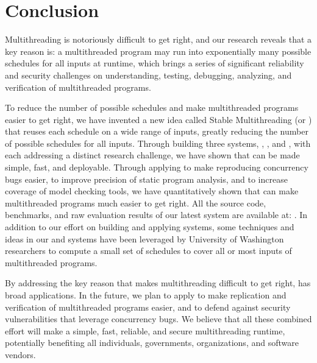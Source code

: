\chapter{Conclusion} \label{sec:conclusion}

Multithreading is notoriously difficult to get right, and our research reveals
that a key reason is: a multithreaded program may run into exponentially many
possible schedules for all inputs at runtime, which brings a series of
significant reliability and security challenges on understanding,
testing, debugging, analyzing, and verification of multithreaded
programs.

To reduce the number of possible schedules and make multithreaded
programs easier to get right, we have invented a new idea called Stable
Multithreading (or \smt) that reuses each schedule on a wide range of inputs,
greatly reducing the number of possible schedules for all inputs. Through
building three \smt systems, \tern, \peregrine, and \parrot, with each addressing
a distinct research challenge, we have shown that \smt can be made simple, fast,
and deployable. Through applying \smt to make reproducing concurrency bugs
easier, to improve precision of static program analysis, and to increase
coverage of model checking tools, we have quantitatively shown that \smt can
make multithreaded programs much easier to get right. All the source code,
benchmarks, and raw evaluation results of our latest \smt system \parrot are
available at: \github. In addition to our effort on building and applying \smt
systems, some techniques and ideas in our \tern and \peregrine systems have been
leveraged by University of Washington researchers to compute a small set of
schedules to cover all or most inputs of multithreaded programs.

By addressing the key reason that makes multithreading difficult to get right,
\smt has broad applications. In the future, we plan to apply \smt to make
replication and verification of multithreaded programs easier, and to defend
against security vulnerabilities that leverage concurrency bugs. We believe that
all these combined effort will make \smt a simple, fast, reliable, and secure
multithreading runtime, potentially benefiting all individuals, governments,
organizations, and software vendors. 